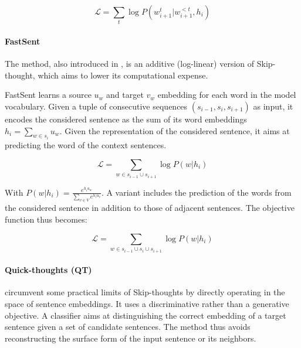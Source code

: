\begin{equation*}
    \mathcal{L} = \sum_t \log P(w_{i+1}^t | w_{i+1}^{<t}, h_i)
\end{equation*}

\paragraph{FastSent} The method, also introduced in \textcite{hill_16}, is an additive (log-linear) version of Skip-thought, which aims to lower its computational expense.  %

FastSent learns a source $u_w$ and target $v_w$ embedding for each word in the model vocabulary. Given a tuple of consecutive sequences $(s_{i-1}, s_i, s_{i+1})$ as input, it encodes the considered sentence as the sum of its word embeddings $h_i = \sum_{w \in s_i}u_w$. Given the representation of the considered sentence, it aims at predicting the word of the context sentences. 

\begin{equation*}
    \mathcal{L} = \sum_{w \in s_{i-1} \cup s_{i+1}} \log P(w | h_i)
\end{equation*}

With $P(w | h_i) = \frac{e^{h_i u_w}}{\sum_{v \in V}e^{h_i u_v}}$. A variant includes the prediction of the words from the considered sentence in addition to those of adjacent sentences. The objective function thus becomes:

\begin{equation*}
    \mathcal{L} = \sum_{w \in s_{i-1} \cup s_{i} \cup s_{i+1}} \log P(w | h_i)
\end{equation*}

\paragraph{Quick-thoughts (QT)} \textcite{logeswaran_18} circumvent some practical limits of Skip-thoughts by directly operating in the space of sentence embeddings. It uses a discriminative rather than a generative objective. A classifier aims at distinguishing the correct embedding of a target sentence given a set of candidate sentences. The method thus avoids reconstructing the surface form of the input sentence or its neighbors.

